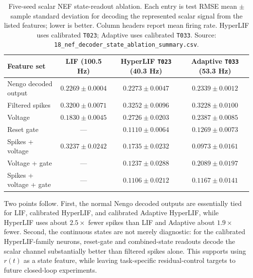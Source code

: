 \documentclass[11pt]{article}
\newcommand{\code}[1]{\texttt{#1}}
\begin{document}
\begin{table}[t]
  \centering
  \caption{Five-seed scalar NEF state-readout ablation. Each entry is test RMSE
  mean \(\pm\) sample standard deviation for decoding the represented scalar
  signal from the listed features; lower is better. Column headers report mean
  firing rate. HyperLIF uses calibrated \code{T023}; Adaptive uses calibrated
  \code{T033}. Source:
  \code{18\_nef\_decoder\_state\_ablation\_summary.csv}.}
  \label{tab:nef-decoder-ablation}
  \scriptsize
  \setlength{\tabcolsep}{4pt}
  \begin{tabular}{lccc}
    \toprule
    Feature set & LIF (100.5 Hz) & HyperLIF \code{T023} (40.3 Hz) & Adaptive \code{T033} (53.3 Hz) \\
    \midrule
    Nengo decoded output & \(0.2269\pm0.0004\) & \(0.2273\pm0.0047\) & \(0.2339\pm0.0012\) \\
    Filtered spikes & \(0.3200\pm0.0071\) & \(0.3252\pm0.0096\) & \(0.3228\pm0.0100\) \\
    Voltage & \(0.1830\pm0.0045\) & \(0.2726\pm0.0203\) & \(0.2387\pm0.0085\) \\
    Reset gate & --- & \(0.1110\pm0.0064\) & \(0.1269\pm0.0073\) \\
    Spikes + voltage & \(0.3237\pm0.0242\) & \(0.1735\pm0.0232\) & \(\mathbf{0.0973\pm0.0161}\) \\
    Voltage + gate & --- & \(0.1237\pm0.0288\) & \(0.2089\pm0.0197\) \\
    Spikes + voltage + gate & --- & \(\mathbf{0.1106\pm0.0212}\) & \(0.1167\pm0.0141\) \\
    \bottomrule
  \end{tabular}
\end{table}

Two points follow. First, the normal Nengo decoded outputs are essentially tied
for LIF, calibrated HyperLIF, and calibrated Adaptive HyperLIF, while HyperLIF
uses about \(2.5\times\) fewer spikes than LIF and Adaptive about \(1.9\times\)
fewer. Second, the continuous states are not merely diagnostic: for the
calibrated HyperLIF-family neurons, reset-gate and combined-state readouts decode
the scalar channel substantially better than filtered spikes alone. This supports
using \(r(t)\) as a state feature, while leaving task-specific residual-control
targets to future closed-loop experiments.
\end{document}
